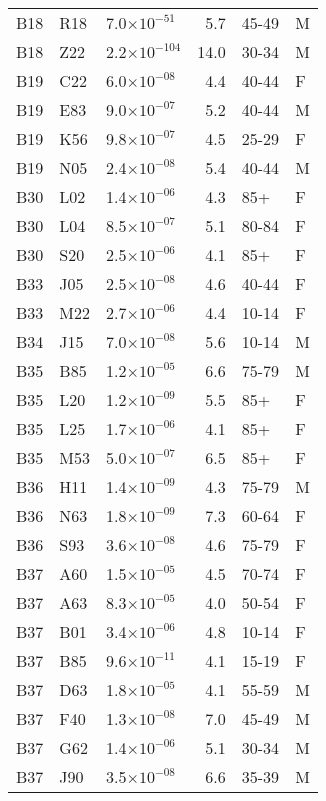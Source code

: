 \begin{longtable}{lllrll}
   B18 & R18 & 7.0$\times10^{-51}$ & 5.7 & 45-49 & M \\ 
   B18 & Z22 & 2.2$\times10^{-104}$ & 14.0 & 30-34 & M \\ 
   B19 & C22 & 6.0$\times10^{-08}$ & 4.4 & 40-44 & F \\ 
   B19 & E83 & 9.0$\times10^{-07}$ & 5.2 & 40-44 & M \\ 
   B19 & K56 & 9.8$\times10^{-07}$ & 4.5 & 25-29 & F \\ 
   B19 & N05 & 2.4$\times10^{-08}$ & 5.4 & 40-44 & M \\ 
   B30 & L02 & 1.4$\times10^{-06}$ & 4.3 & 85+ & F \\ 
   B30 & L04 & 8.5$\times10^{-07}$ & 5.1 & 80-84 & F \\ 
   B30 & S20 & 2.5$\times10^{-06}$ & 4.1 & 85+ & F \\ 
   B33 & J05 & 2.5$\times10^{-08}$ & 4.6 & 40-44 & F \\ 
   B33 & M22 & 2.7$\times10^{-06}$ & 4.4 & 10-14 & F \\ 
   B34 & J15 & 7.0$\times10^{-08}$ & 5.6 & 10-14 & M \\ 
   B35 & B85 & 1.2$\times10^{-05}$ & 6.6 & 75-79 & M \\ 
   B35 & L20 & 1.2$\times10^{-09}$ & 5.5 & 85+ & F \\ 
   B35 & L25 & 1.7$\times10^{-06}$ & 4.1 & 85+ & F \\ 
   B35 & M53 & 5.0$\times10^{-07}$ & 6.5 & 85+ & F \\ 
   B36 & H11 & 1.4$\times10^{-09}$ & 4.3 & 75-79 & M \\ 
   B36 & N63 & 1.8$\times10^{-09}$ & 7.3 & 60-64 & F \\ 
   B36 & S93 & 3.6$\times10^{-08}$ & 4.6 & 75-79 & F \\ 
   B37 & A60 & 1.5$\times10^{-05}$ & 4.5 & 70-74 & F \\ 
   B37 & A63 & 8.3$\times10^{-05}$ & 4.0 & 50-54 & F \\ 
   B37 & B01 & 3.4$\times10^{-06}$ & 4.8 & 10-14 & F \\ 
   B37 & B85 & 9.6$\times10^{-11}$ & 4.1 & 15-19 & F \\ 
   B37 & D63 & 1.8$\times10^{-05}$ & 4.1 & 55-59 & M \\ 
   B37 & F40 & 1.3$\times10^{-08}$ & 7.0 & 45-49 & M \\ 
   B37 & G62 & 1.4$\times10^{-06}$ & 5.1 & 30-34 & M \\ 
   B37 & J90 & 3.5$\times10^{-08}$ & 6.6 & 35-39 & M \\ 

\end{longtable}
